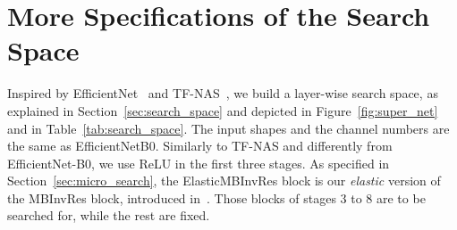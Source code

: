 \documentclass[dvipsnames,table,xcdraw]{article}
\begin{document}
\section{More Specifications of the Search Space}
Inspired by EfficientNet~\cite{effnet} and TF-NAS~\cite{TF-NAS}, we build a layer-wise search space, as explained in Section~\ref{sec:search_space} and depicted in Figure~\ref{fig:super_net} and in Table~\ref{tab:search_space}.
The input shapes and the channel numbers are the same as EfficientNetB0. Similarly to TF-NAS and differently from EfficientNet-B0, we use ReLU in the first three stages. As specified in Section~\ref{sec:micro_search}, the ElasticMBInvRes block is our \textit{elastic} version of the MBInvRes block, introduced in~\cite{mobilenetv2}. Those blocks of stages 3 to 8 are to be searched for, while the rest are fixed.
~
\\
~
\begin{table}[h]
  \caption{Macro architecture of the one-shot model. "MBInvRes" is the basic block in~\cite{mobilenetv2}. "ElasticMBInvRes" denotes our \textit{elastic} blocks (Section~\ref{sec:micro_search}) to be searched for. "$C_{out}$" stands for the output channels. Act denotes the activation function used in a stage. "b" is the number of blocks in a stage, where $[\underline{b}, \bar{b}]$ is a discrete interval. If necessary, the down-sampling occurs at the first block of a stage.}
  \label{tab:search_space}
  \end{table}
\end{document}
